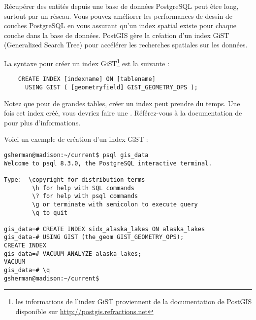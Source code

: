 R\'ecup\'erer des entit\'es depuis une base de donn\'ees PostgreSQL peut \^etre long, surtout par un r\'eseau. Vous pouvez am\'eliorer les performances de dessin de couches PostgreSQL en vous assurant qu'un  index spatial existe pour chaque couche dans la base de donn\'ees. PostGIS g\`ere la cr\'eation d'un index  GiST (Generalized Search Tree) pour acc\'el\'erer les recherches spatiales sur les donn\'ees.

La syntaxe pour cr\'eer un index GiST\footnote{les informations de l'index GiST proviennent de la documentation de PostGIS disponible sur \url{http://postgis.refractions.net}} est la suivante :

\begin{verbatim}
    CREATE INDEX [indexname] ON [tablename]
      USING GIST ( [geometryfield] GIST_GEOMETRY_OPS );
\end{verbatim}

Notez que pour de grandes tables, cr\'eer un index peut prendre du temps. Une fois cet index cr\'e\'e, vous devriez faire une . R\'ef\'erez-vous \`a la documentation de \cite{PostGISweb} pour plus d'informations.

Voici un exemple de cr\'eation d'un index GiST :
\begin{verbatim}
gsherman@madison:~/current$ psql gis_data
Welcome to psql 8.3.0, the PostgreSQL interactive terminal.

Type:  \copyright for distribution terms
        \h for help with SQL commands
        \? for help with psql commands
        \g or terminate with semicolon to execute query
        \q to quit

gis_data=# CREATE INDEX sidx_alaska_lakes ON alaska_lakes
gis_data-# USING GIST (the_geom GIST_GEOMETRY_OPS);
CREATE INDEX
gis_data=# VACUUM ANALYZE alaska_lakes;
VACUUM
gis_data=# \q
gsherman@madison:~/current$
\end{verbatim}

